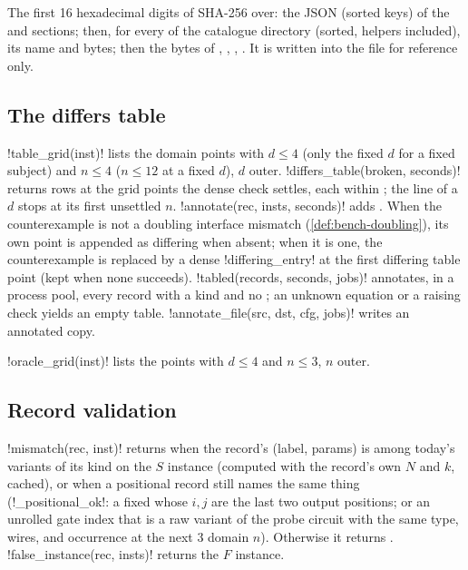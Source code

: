 \begin{definition}
The first 16 hexadecimal digits of SHA-256 over: the JSON (sorted keys) of the 
and  sections; then, for every  of the catalogue directory (sorted,
helpers included), its name and bytes; then the bytes of , ,
, . It is written into the file for reference only.
\end{definition}

\subsection{The differs table}

\py!table_grid(inst)! lists the domain points with $d\le 4$ (only the fixed $d$ for a fixed
subject) and $n\le4$ ($n\le12$ at a fixed $d$), $d$ outer. \py!differs_table(broken, seconds)!
returns rows \code{[n, d, differs]} at the grid points the dense check settles, each within
; the line of a $d$ stops at its first unsettled $n$. \py!annotate(rec, insts, seconds)! adds . When the counterexample is not a doubling interface mismatch
(\cref{def:bench-doubling}), its own point is appended as differing when absent; when it is one,
the counterexample is replaced by a dense \py!differing_entry! at the first differing table
point (kept when none succeeds). \py!tabled(records, seconds, jobs)! annotates, in a process
pool, every record with a kind and no ; an unknown equation or a raising check
yields an empty table. \py!annotate_file(src, dst, cfg, jobs)! writes an annotated copy.

\py!oracle_grid(inst)! lists the points with $d\le4$ and $n\le3$, $n$ outer.

\subsection{Record validation}

\py!mismatch(rec, inst)! returns  when the record's (label, params) is among today's
variants of its kind on the $S$ instance (computed with the record's own $N$ and $k$, cached), or
when a positional record still names the same thing (\py!_positional_ok!: a fixed
 whose $i, j$ are the last two output positions; or an unrolled gate
index that is a raw variant of the probe circuit with the same type, wires, and occurrence at the
next 3 domain $n$). Otherwise it returns . \py!false_instance(rec, insts)! returns the $F$ instance.

